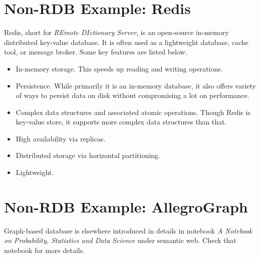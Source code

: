\chapter{Non-RDB Example: Redis}

Redis, short for \textit{REmote DIctionary Server}, is an open-source in-memory distributed key-value database. It is often used as a lightweight database, cache tool, or message broker. Some key features are listed below.

\begin{itemize}
\item In-memory storage. This speeds up reading and writing operations.
\item Persistence. While primarily it is an in-memory database, it also offers variety of ways to persist data on disk without compromising a lot on performance.
\item Complex data structures and associated atomic operations. Though Redis is key-value store, it supports more complex data structures than that.
\item High availability via replicas.
\item Distributed storage via horizontal partitioning.
\item Lightweight.
\end{itemize}

\chapter{Non-RDB Example: AllegroGraph}

Graph-based database is elsewhere introduced in details in notebook \textit{A Notebook on Probability, Statistics and Data Science} under semantic web. Check that notebook for more details. 